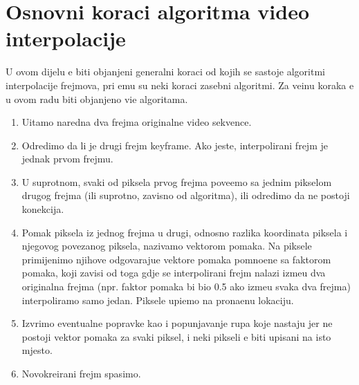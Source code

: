 \section{Osnovni koraci algoritma video interpolacije}
U ovom dijelu \cj e biti obja\sh njeni generalni koraci od kojih se sastoje algoritmi interpolacije frejmova, pri \ch emu su neki koraci zasebni algoritmi. Za ve\cj inu koraka \cj e u ovom radu biti obja\sh njeno
vi\sh e algoritama.
\begin{enumerate}
	\item U\ch itamo naredna dva frejma originalne video sekvence.
	\item Odredimo da li je drugi frejm keyframe. Ako jeste, interpolirani frejm je jednak prvom frejmu.
	\item U suprotnom, svaki od piksela prvog frejma pove\zh emo sa jednim pikselom drugog frejma (ili suprotno, zavisno od algoritma), ili odredimo da ne postoji konekcija.
	\item Pomak piksela iz jednog frejma u drugi, odnosno razlika koordinata piksela i njegovog povezanog piksela, nazivamo vektorom pomaka. Na piksele primijenimo njihove odgovaraju\cj e vektore
	pomaka pomno\zh ene sa faktorom pomaka, koji zavisi od toga gdje se interpolirani frejm nalazi izme\dj u dva originalna frejma (npr. faktor pomaka bi bio 0.5 ako izme\dj u svaka dva frejma)
	interpoliramo samo jedan. Piksele upi\sh emo na prona\dj enu lokaciju.
	\item Izvr\sh imo eventualne popravke kao i popunjavanje rupa koje nastaju jer ne postoji vektor pomaka za svaki piksel, i neki pikseli \cj e biti upisani na isto mjesto.
	\item Novokreirani frejm spasimo.
\end{enumerate}